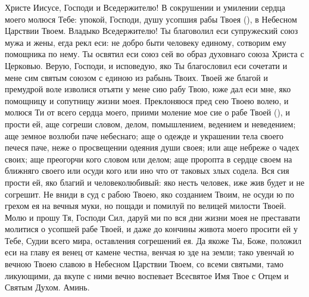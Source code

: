 \begin{mymulticols}
 


Христе Иисусе, Господи и Вседержителю! В сокрушении и умилении сердца моего молюся Тебе: упокой, Господи, душу усопшия рабы Твоея (), в Небесном Царствии Твоем. Владыко Вседержителю! Ты благоволил еси супружеский союз мужа и жены, егда рекл еси: не добро быти человеку единому, сотворим ему помощника по нему. Ты освятил еси союз сей во образ духовнаго союза Христа с Церковью. Верую, Господи, и исповедую, яко Ты благословил еси сочетати и мене сим святым союзом с единою из рабынь Твоих. Твоей же благой и премудрой воле изволися отъяти у мене сию рабу Твою, юже дал еси мне, яко помощницу и сопутницу жизни моея. Преклоняюся пред сею Твоею волею, и молюся Ти от всего сердца моего, приими моление мое сие о рабе Твоей (), и прости ей, аще согреши словом, делом, помышлением, ведением и неведением; аще земное возлюби паче небеснаго; аще о одежде и украшении тела своего печеся паче, неже о просвещении одеяния души своея; или аще небреже о чадех своих; аще преогорчи кого словом или делом; аще проропта в сердце своем на ближняго своего или осуди кого или ино что от таковых злых содела. Вся сия прости ей, яко благий и человеколюбивый: яко несть человек, иже жив будет и не согрешит. Не вниди в суд с рабою Твоею, яко созданием Твоим, не осуди ю по грехом ея на вечныя муки, но пощади и помилуй по велицей милости Твоей. Молю и прошу Тя, Господи Сил, даруй ми по вся дни жизни моея не преставати молитися о усопшей рабе Твоей, и даже до кончины живота моего просити ей у Тебе, Судии всего мира, оставления согрешений ея. Да якоже Ты, Боже, положил еси на главу ея венец от камене честна, венчая ю зде на земли; тако увенчай ю вечною Твоею славою в Небесном Царствии Твоем, со всеми святыми, тамо ликующими, да вкупе с ними вечно воспевает Всесвятое Имя Твое с Отцем и Святым Духом. Аминь. 

\end{mymulticols}

\mychapterending


